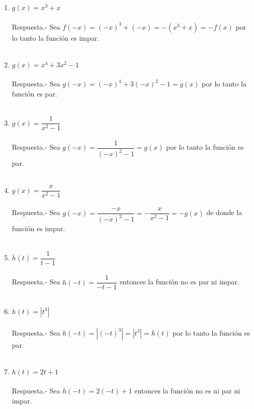 \begin{enumerate}
    \item $g(x)=x^3  + x$\\\\
	Respuesta.-\; Sea $f(-x) = (-x)^3 + (-x) = -(x^3 + x) = -f(x)$ por lo tanto la función es impar.\\\\

    \item $g(x)=x^4 + 3x^2 - 1$\\\\
	Respuesta.-\; Sea $g(-x) = (-x)^4 + 3(-x)^2 - 1 = g(x)$ por lo tanto la función es par.\\\\

    \item $g(x)=\dfrac{1}{x^2-1}$\\\\
	Respuesta.-\; Sea $g(-x)=\dfrac{1}{(-x)^2 - 1} = g(x)$ por lo tanto la función es par.\\\\

    \item $g(x)=\dfrac{x}{x^2 - 1}$\\\\
	Respuesta.-\; Sea $g(-x)=\dfrac{-x}{(-x)^2 - 1} = - \dfrac{x}{x^2 - 1} = -g(x)$ de donde la función es impar.\\\\

    \item $h(t)=\dfrac{1}{t-1}$\\\\
	Respuesta.-\; Sea $h(-t)=\dfrac{1}{-t-1}$ entonces la función no es par ni impar.\\\\

    \item $h(t)=|t^3|$\\\\
	Respuesta.-\; Sea $h(-t)=|(-t)^3| = |t^3| = h(t)$ por lo tanto la función es par.\\\\

    \item $h(t)=2t+1$\\\\
	Respuesta.-\; Sea $h(-t) = 2(-t) + 1$ entonces la función no es ni par ni impar.\\\\


\end{enumerate}
